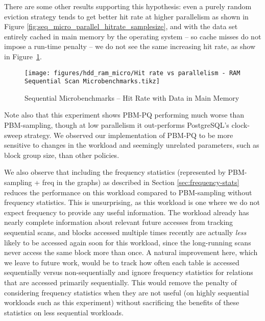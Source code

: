 
There are some other results supporting this hypothesis: even a purely random eviction strategy tends to get better hit rate at higher parallelism as shown in Figure \ref{fig:seq_micro_parallel_hitrate_samplesize}, and with the data set entirely cached in main memory by the operating system -- so cache misses do not impose a run-time penalty -- we do not see the same increasing hit rate, as show in Figure~\ref{fig:ram_hit_rate}.

\begin{figure}[H]%
    \centering
    \texttt{[image: figures/hdd\_ram\_micro/Hit rate vs parallelism - RAM Sequential Scan Microbenchmarks.tikz]}
    \caption{Sequential Microbenchmarks -- Hit Rate with Data in Main Memory}
    \label{fig:ram_hit_rate}
\end{figure}

Note also that this experiment shows PBM-PQ performing much worse than PBM-sampling, though at low parallelism it out-performs PostgreSQL's clock-sweep strategy. We observed our implementation of PBM-PQ to be more sensitive to changes in the workload and seemingly unrelated parameters, such as block group size, than other policies. %

We also observe that including the frequency statistics (represented by PBM-sampling + freq in the graphs) as described in Section \ref{sec:frequency-stats} reduces the performance on this workload compared to PBM-sampling without frequency statistics. This is unsurprising, as this workload is one where we do not expect frequency to provide any useful information. The workload already has nearly complete information about relevant future accesses from tracking sequential scans, and blocks accessed multiple times recently are actually \textit{less} likely to be accessed again soon for this workload, since the long-running scans never access the same block more than once. A natural improvement here, which we leave to future work, would be to track how often each table is accessed sequentially versus non-sequentially and ignore frequency statistics for relations that are accessed primarily sequentially. This would remove the penalty of considering frequency statistics when they are not useful (on highly sequential workloads such as this experiment) without sacrificing the benefits of these statistics on less sequential workloads.


